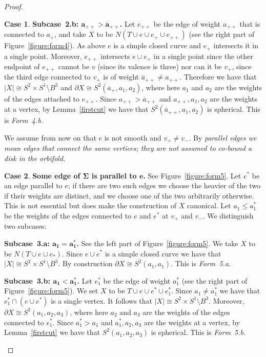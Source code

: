 \documentclass[12pt,reqno]{amsart}
\theoremstyle{plain}
\theoremstyle{definition}
\newtheorem{case}{Case}
\numberwithin{subcase}{case}
\theoremstyle{plain}
\theoremstyle{definition}
\def\ep{e_{+}}
\def\epp{e_{++}}
\def\app{a_{++}}
\def\oap{\overline{a}_{+}}
\def\oapp{\overline{a}_{++}}
\def\ap{a_{+}}
\def\vp{v_{+}}
\def\vm{v_{-}}
\def\oapp{\overline{a}_{++}}
\begin{document}
\begin{proof}
\begin{case}
\bigskip\noindent
{\bf Subcase~2.b: \(\boldsymbol{\app > \oapp}\).}  Let \(\epp\) be the edge of weight \(\app\) that is connected to \(\ap\), and take \(X\) to be \(N\left(T \cup e \cup \ep \cup \epp \right)\) (see the right part of Figure~\ref{figure:form4}).  As above \(e\) is a simple closed curve and \(\ep\) intersects it in a single point. Moreover, \(\epp\) intersects \(e \cup \ep\) in a single point since the other endpoint of \(\epp\) cannot be \(v\) (since its valence is three) nor can it be \(\vp\), since the third edge connected to \(\vp\) is of weight \(\oapp \neq \app\).
Therefore we have that \(|X| \cong S^{2} \times S^{1} \setminus B^{3}\) and \(\partial X \cong S^{2}(\oap,a_{1},a_{2})\), where here \(a_{1}\) and \(a_{2}\) are the weights of the edges attached to \(e_{++}\).  Since \(\app > \oapp\) and \(\app,a_{1},a_{2}\) are the weights at a vertex, by Lemma~\ref{firstcut} we have that \( S^{2}(\oapp,a_{1},a_{2})\) is spherical. 
This is \em Form~4.b\em.
\end{case}
 
\bigskip\noindent We assume from now on that \(e\) is not smooth and \(\vp \neq \vm\).  By \em parallel edges \em we mean edges that connect the same vertices; they are not assumed to co-bound a disk in the orbifold.

\bigskip

\noindent\begin{case}
\label{case:ParallelEdge}
\textbf{Some edge of \(\boldsymbol{\Sigma}\) is parallel to \(\boldsymbol{e}\).}  See Figure~\ref{figure:form5}. Let \(e^{*}\) be an edge parallel to \(e\); if there are two such edges 
we choose the heavier of the two if their weights are distinct, and we choose one of the two arbitrarily otherwise.  This is not essential but does make the construction of \(X\) canonical.  Let \(a_{1} \leq a_{1}^{*}\) be the weights of the edges connected to \(e\) and \(e^{*}\) at \(\vp\) and \(\vm\). We distinguish two subcases:

\bigskip\noindent
{\bf Subcase~3.a: \(\boldsymbol{a_{1} = a_{1}^{*}}\).} 
See the left part of Figure~\ref{figure:form5}.  We take \(X\) to be \(N\left(T \cup e \cup e_{*}\right)\).  Since \(e \cup e^{*}\) is a simple closed curve we have that \(|X| \cong S^{2} \times S^{1} \setminus B^{3}\). By construction \(\partial X \cong S^{2}(a_{1},a_{1})\).  This is \em Form~5.a\em.

\bigskip\noindent
{\bf Subcase~3.b: \(\boldsymbol{a_{1} < a_{1}^{*}}\).} 
Let \(e_{1}^{*}\) be the edge of weight \(a_{1}^{*}\) (see the right part of Figure~\ref{figure:form5}). We set \(X\) to be \(T \cup e \cup e^{*} \cup e_{1}^{*}\).  Since \(a_{1} \neq a_{1}^{*}\) we have that \(e_{1}^{*} \cap \left(e \cup e^{*}\right)\) is a single vertex. 
It follows that \(|X| \cong S^{2} \times S^{1} \setminus B^{3}\).  Moreover, \(\partial X \cong S^{2}(a_{1},a_{2},a_{3})\), where here \(a_{2}\) and \(a_{3}\) are the weights of the edges connected to \(e_{1}^{*}\).   Since \(a_{1}^{*} > a_{1}\) and \(a_{1}^{*},a_{2},a_{3}\) are the weights at a vertex, by Lemma~\ref{firstcut} we have that \( S^{2}(a_{1},a_{2},a_{3})\) is spherical. This is \em Form~5.b\em.
\end{case}


\end{proof}
\end{document}
